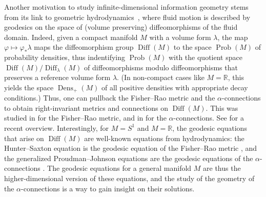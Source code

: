 \documentclass[11pt,reqno]{amsart}
\theoremstyle{definition}
\newcommand{\R}{\mathbb R}
\newcommand{\dx}{\lambda}
\newcommand{\Prob}{\operatorname{Prob}(M)}
\newcommand{\Dens}{\operatorname{Dens}_+(M)}
\newcommand{\Diff}{\operatorname{Diff}(M)}
\newcommand{\SDiff}{\operatorname{Diff}_{\dx}(M)}
\begin{document}
% 
Another motivation to study infinite-dimensional information geometry stems from its link to geometric hydrodynamics~\cite{khesin2024information,khesin2013geometry,lenells2014amari}, where fluid motion is described by geodesics on the space of (volume preserving) diffeomorphisms of the fluid domain. Indeed,  %
given a compact manifold $M$ with a volume form $\lambda$, the map $\varphi\mapsto \varphi_*\lambda$ maps the diffeomorphism group $\Diff$ to the space $\Prob$ of probability densities, thus indentifying $\Prob$ with the quotient space $\Diff/\SDiff$ of diffeomorphisms modulo diffeomorphisms that preserves a reference volume form $\lambda$. 
(In non-compact cases like $M=\R$, this yields the space $\Dens$ of all positive densities with appropriate decay conditions.) 
Thus, one can pullback the 
 Fisher--Rao metric and the $\alpha$-connections to obtain right-invariant metrics and connections on $\Diff$. 
 This was studied in \cite{khesin2013geometry,modin2015generalized} for the Fisher--Rao metric, and in \cite{lenells2014amari,bauer2024p} for the $\alpha$-connections.
 See \cite{khesin2024information} for a recent overview.
 Interestingly, for $M=S^1$ and $M=\R$, the geodesic equations that arise on $\Diff$ are well-known equations from hydrodynamics: the Hunter--Saxton equation is the geodesic equation of the Fisher--Rao metric \cite{khesin2013geometry}, and the generalized Proudman--Johnson equations are the geodesic equations of the $\alpha$-connections \cite{lenells2014amari}. 
The geodesic equations for a general manifold $M$ are thus the higher-dimensional version of these equations, and the study of the geometry of the $\alpha$-connections is a way to gain insight on their solutions.
\end{document}
